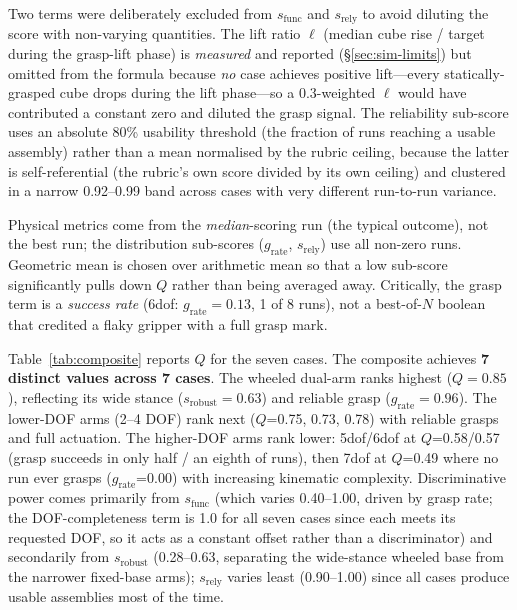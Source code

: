 \documentclass[conference]{IEEEtran}
\begin{document}
Two terms were deliberately excluded from $s_{\text{func}}$ and $s_{\text{rely}}$ to avoid diluting the score with non-varying quantities. The lift ratio $\ell$ (median cube rise / target during the grasp-lift phase) is \emph{measured} and reported (\S\ref{sec:sim-limits}) but omitted from the formula because \emph{no} case achieves positive lift---every statically-grasped cube drops during the lift phase---so a 0.3-weighted $\ell$ would have contributed a constant zero and diluted the grasp signal. The reliability sub-score uses an absolute 80\% usability threshold (the fraction of runs reaching a usable assembly) rather than a mean normalised by the rubric ceiling, because the latter is self-referential (the rubric's own score divided by its own ceiling) and clustered in a narrow 0.92--0.99 band across cases with very different run-to-run variance.

Physical metrics come from the \emph{median}-scoring run (the typical outcome), not the best run; the distribution sub-scores ($g_{\text{rate}}$, $s_{\text{rely}}$) use all non-zero runs. Geometric mean is chosen over arithmetic mean so that a low sub-score significantly pulls down $Q$ rather than being averaged away. Critically, the grasp term is a \emph{success rate} (6dof: $g_{\text{rate}}=0.13$, 1 of 8 runs), not a best-of-$N$ boolean that credited a flaky gripper with a full grasp mark.

Table~\ref{tab:composite} reports $Q$ for the seven cases. The composite achieves \textbf{7 distinct values across 7 cases}. The wheeled dual-arm ranks highest ($Q=0.85$), reflecting its wide stance ($s_{\text{robust}}=0.63$) and reliable grasp ($g_{\text{rate}}=0.96$). The lower-DOF arms (2--4 DOF) rank next ($Q$=0.75, 0.73, 0.78) with reliable grasps and full actuation. The higher-DOF arms rank lower: 5dof/6dof at $Q$=0.58/0.57 (grasp succeeds in only half / an eighth of runs), then 7dof at $Q$=0.49 where no run ever grasps ($g_{\text{rate}}$=0.00) with increasing kinematic complexity. Discriminative power comes primarily from $s_{\text{func}}$ (which varies 0.40--1.00, driven by grasp rate; the DOF-completeness term is 1.0 for all seven cases since each meets its requested DOF, so it acts as a constant offset rather than a discriminator) and secondarily from $s_{\text{robust}}$ (0.28--0.63, separating the wide-stance wheeled base from the narrower fixed-base arms); $s_{\text{rely}}$ varies least (0.90--1.00) since all cases produce usable assemblies most of the time.
\end{document}
